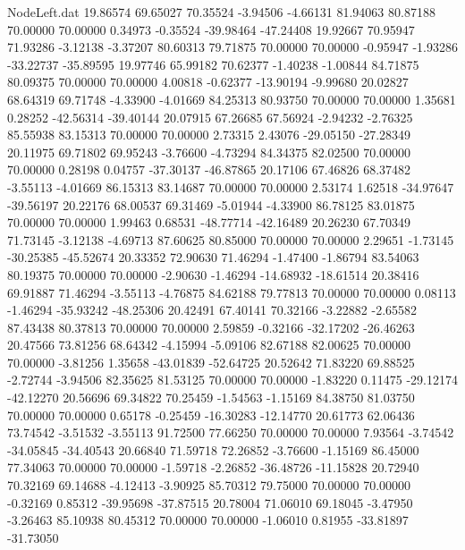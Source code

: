 \begin{filecontents}{NodeLeft.dat}
  19.86574   69.65027   70.35524    -3.94506   -4.66131   81.94063   80.87188   70.00000   70.00000    0.34973   -0.35524  -39.98464  -47.24408
  19.92667   70.95947   71.93286    -3.12138   -3.37207   80.60313   79.71875   70.00000   70.00000   -0.95947   -1.93286  -33.22737  -35.89595
  19.97746   65.99182   70.62377    -1.40238   -1.00844   84.71875   80.09375   70.00000   70.00000    4.00818   -0.62377  -13.90194   -9.99680
  20.02827   68.64319   69.71748    -4.33900   -4.01669   84.25313   80.93750   70.00000   70.00000    1.35681    0.28252  -42.56314  -39.40144
  20.07915   67.26685   67.56924    -2.94232   -2.76325   85.55938   83.15313   70.00000   70.00000    2.73315    2.43076  -29.05150  -27.28349
  20.11975   69.71802   69.95243    -3.76600   -4.73294   84.34375   82.02500   70.00000   70.00000    0.28198    0.04757  -37.30137  -46.87865
  20.17106   67.46826   68.37482    -3.55113   -4.01669   86.15313   83.14687   70.00000   70.00000    2.53174    1.62518  -34.97647  -39.56197
  20.22176   68.00537   69.31469    -5.01944   -4.33900   86.78125   83.01875   70.00000   70.00000    1.99463    0.68531  -48.77714  -42.16489
  20.26230   67.70349   71.73145    -3.12138   -4.69713   87.60625   80.85000   70.00000   70.00000    2.29651   -1.73145  -30.25385  -45.52674
  20.33352   72.90630   71.46294    -1.47400   -1.86794   83.54063   80.19375   70.00000   70.00000   -2.90630   -1.46294  -14.68932  -18.61514
  20.38416   69.91887   71.46294    -3.55113   -4.76875   84.62188   79.77813   70.00000   70.00000    0.08113   -1.46294  -35.93242  -48.25306
  20.42491   67.40141   70.32166    -3.22882   -2.65582   87.43438   80.37813   70.00000   70.00000    2.59859   -0.32166  -32.17202  -26.46263
  20.47566   73.81256   68.64342    -4.15994   -5.09106   82.67188   82.00625   70.00000   70.00000   -3.81256    1.35658  -43.01839  -52.64725
  20.52642   71.83220   69.88525    -2.72744   -3.94506   82.35625   81.53125   70.00000   70.00000   -1.83220    0.11475  -29.12174  -42.12270
  20.56696   69.34822   70.25459    -1.54563   -1.15169   84.38750   81.03750   70.00000   70.00000    0.65178   -0.25459  -16.30283  -12.14770
  20.61773   62.06436   73.74542    -3.51532   -3.55113   91.72500   77.66250   70.00000   70.00000    7.93564   -3.74542  -34.05845  -34.40543
  20.66840   71.59718   72.26852    -3.76600   -1.15169   86.45000   77.34063   70.00000   70.00000   -1.59718   -2.26852  -36.48726  -11.15828
  20.72940   70.32169   69.14688    -4.12413   -3.90925   85.70312   79.75000   70.00000   70.00000   -0.32169    0.85312  -39.95698  -37.87515
  20.78004   71.06010   69.18045    -3.47950   -3.26463   85.10938   80.45312   70.00000   70.00000   -1.06010    0.81955  -33.81897  -31.73050

\end{filecontents}
